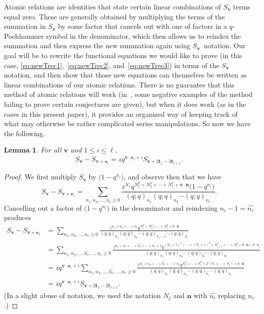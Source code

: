 \documentclass[pdftex]{sigma}
\numberwithin{equation}{section}
\newtheorem{Lemma}[Theorem]{Lemma}
\theoremstyle{definition}
\newcommand{\nihat}{{\widehat{n_i}}}
\newcommand{\tr}{\mathbf{t}}
\newcommand{\nn}{\mathbf{n}}
\newcommand{\vv}{\mathbf{v}}
\newcommand{\ee}{\mathbf{e}}
\begin{document}
Atomic relations are identities that state certain linear combinations of $S_\vv$ terms equal zero. These are generally obtained by multiplying the terms of the summation in $S_\vv$ by some factor that cancels out with one of factors in a $q$-Pochhammer symbol in the denominator, which then allows us to reindex the summation and then express the new summation again using $S_\vv$~notation. Our goal will be to rewrite the functional equations we would like to prove (in this case, \eqref{eq:newTrec1},~\eqref{eq:newTrec2}, and~\eqref{eq:newTrec3}) in terms of the $S_\vv$ notation, and then show that those new equations can themselves be written as linear combinations of our atomic relations. There is no guarantee that this method of atomic relations will work (in~\cite{KanRus-cylindric}, some negative examples of the method failing to prove certain conjectures are given), but when it does work (as in the cases in this present paper), it provides an organized way of keeping track of what may otherwise be rather complicated series manipulations. So now we have the following.
\begin{Lemma} \label{lem:atomAG}
For all $\vv$ and $1\le i \le \ell,$
\begin{equation*}
S_\vv - S_{\vv+\ee_i} = zq^{\vv\cdot\ee_i+i} S_{\vv+2\tr_1-2\tr_{i+1}}.
\end{equation*}
\end{Lemma}
\begin{proof}
We first multiply $S_\vv$ by $\bigl(1-q^{n_i}\bigr)$, and observe then that we have
\begin{equation*}
S_\vv-S_{\vv+\ee_i} =\sum_{n_1,n_2,\dots,n_{\ell}\ge 0} \frac{z^{N_1}q^{N_1^2+N_2^2+\cdots+N_{\ell}^2+\vv \cdot \nn}\bigl(1-q^{n_i}\bigr)}{(q;q)_{n_1}(q;q)_{n_2}\cdots(q;q)_{n_{\ell}}}.
\end{equation*}
Cancelling out a factor of $\bigl(1-q^{n_i}\bigr)$ in the denominator and reindexing $n_{i}-1 = \nihat$ produces
\begin{align*}
S_\vv-S_{\vv+\ee_i} &=\sum_{n_1,n_2,\dots,n_{\ell}\ge 0} \frac{z^{n_1+n_2+\cdots+n_{\ell}}q^{N_1^2+N_2^2+\cdots+N_{\ell}^2+\vv \cdot \nn}}{(q;q)_{n_1}(q;q)_{n_2}\cdots(q;q)_{n_{i}-1}\cdots(q;q)_{n_{\ell}}} \\
&=\sum_{n_1,n_2,\dots,\nihat,\dots,n_{\ell}\ge 0}\!\!\!\! \frac{z^{n_1+n_2+\cdots+\nihat+\cdots+n_{\ell}+1}q^{(N_1+1)^2+\cdots+(N_i+1)^2+N_{i+1}^2+\cdots+N_{\ell}^2+\vv \cdot \nn+\vv\cdot\ee_i}}{(q;q)_{n_1}(q;q)_{n_2}\cdots(q;q)_{\nihat}\cdots(q;q)_{n_{\ell}}} \\
&=zq^{\vv\cdot\ee_i+i}\sum_{n_1,n_2,\dots,\nihat,\dots,n_{\ell}\ge 0} \frac{z^{n_1+n_2+\cdots+\nihat+\cdots+n_{\ell}}q^{N_1^2+\cdots+N_{\ell}^2+2(N_1+\cdots+N_i)+\vv \cdot \nn}}{(q;q)_{n_1}(q;q)_{n_2}\cdots(q;q)_{\nihat}\cdots(q;q)_{n_{\ell}}} \\
&= zq^{\vv\cdot\ee_i+i} S_{\vv+2\tr_1-2\tr_{i+1}}.
\end{align*}
(In a slight abuse of notation, we used the notation $N_j$ and $\nn$ with $\nihat$ replacing $n_i$.)
\end{proof}
\end{document}
